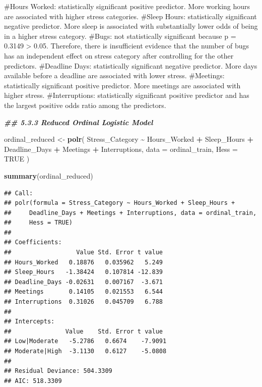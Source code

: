 \documentclass[
]{article}
\newenvironment{Shaded}{\begin{snugshade}}{\end{snugshade}}
\newcommand{\AttributeTok}[1]{\textcolor[rgb]{0.13,0.29,0.53}{#1}}
\newcommand{\ConstantTok}[1]{\textcolor[rgb]{0.56,0.35,0.01}{#1}}
\newcommand{\DocumentationTok}[1]{\textcolor[rgb]{0.56,0.35,0.01}{\textbf{\textit{#1}}}}
\newcommand{\FunctionTok}[1]{\textcolor[rgb]{0.13,0.29,0.53}{\textbf{#1}}}
\newcommand{\NormalTok}[1]{#1}
\newcommand{\OtherTok}[1]{\textcolor[rgb]{0.56,0.35,0.01}{#1}}
\newcommand{\SpecialCharTok}[1]{\textcolor[rgb]{0.81,0.36,0.00}{\textbf{#1}}}
\begin{document}
\#Hours Worked: statistically significant positive predictor. More
working hours are associated with higher stress categories. \#Sleep
Hours: statistically significant negative predictor. More sleep is
associated with substantially lower odds of being in a higher stress
category. \#Bugs: not statistically significant because p = 0.3149
\textgreater{} 0.05. Therefore, there is insufficient evidence that the
number of bugs has an independent effect on stress category after
controlling for the other predictors. \#Deadline Days: statistically
significant negative predictor. More days available before a deadline
are associated with lower stress. \#Meetings: statistically significant
positive predictor. More meetings are associated with higher stress.
\#Interruptions: statistically significant positive predictor and has
the largest positive odds ratio among the predictors.

\begin{Shaded}
\begin{Highlighting}[]
\DocumentationTok{\#\# 5.3.3 Reduced Ordinal Logistic Model}

\NormalTok{ordinal\_reduced }\OtherTok{\textless{}{-}} \FunctionTok{polr}\NormalTok{(}
\NormalTok{  Stress\_Category }\SpecialCharTok{\textasciitilde{}}\NormalTok{ Hours\_Worked }\SpecialCharTok{+}
\NormalTok{    Sleep\_Hours }\SpecialCharTok{+}
\NormalTok{    Deadline\_Days }\SpecialCharTok{+}
\NormalTok{    Meetings }\SpecialCharTok{+}
\NormalTok{    Interruptions,}
  \AttributeTok{data =}\NormalTok{ ordinal\_train,}
  \AttributeTok{Hess =} \ConstantTok{TRUE}
\NormalTok{)}

\FunctionTok{summary}\NormalTok{(ordinal\_reduced)}
\end{Highlighting}
\end{Shaded}

\begin{verbatim}
## Call:
## polr(formula = Stress_Category ~ Hours_Worked + Sleep_Hours + 
##     Deadline_Days + Meetings + Interruptions, data = ordinal_train, 
##     Hess = TRUE)
## 
## Coefficients:
##                  Value Std. Error t value
## Hours_Worked   0.18876   0.035962   5.249
## Sleep_Hours   -1.38424   0.107814 -12.839
## Deadline_Days -0.02631   0.007167  -3.671
## Meetings       0.14105   0.021553   6.544
## Interruptions  0.31026   0.045709   6.788
## 
## Intercepts:
##               Value    Std. Error t value 
## Low|Moderate   -5.2786   0.6674    -7.9091
## Moderate|High  -3.1130   0.6127    -5.0808
## 
## Residual Deviance: 504.3309 
## AIC: 518.3309
\end{verbatim}
\end{document}
